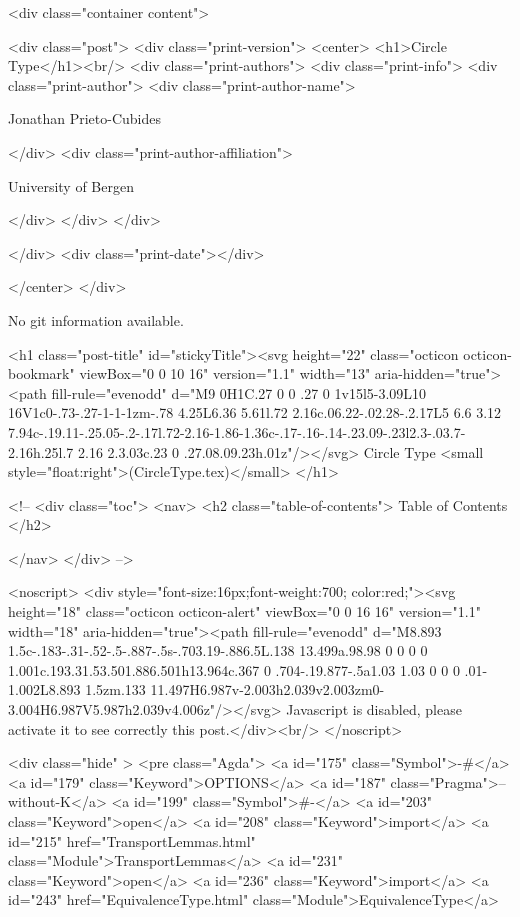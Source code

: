       <div class="container content">
        







<div class="post">
  <div class="print-version">
    <center>
      <h1>Circle Type</h1><br/>
        <div class="print-authors">
          <div class="print-info">
            <div class="print-author">
              <div class="print-author-name">
                
                  Jonathan Prieto-Cubides
                
              </div>
              <div class="print-author-affiliation">
                
                  University of Bergen
                
                </div>
            </div>
          </div>
          
          
        </div>
        <div class="print-date"></div>
        
        
    </center>
  </div>

  
  No git information available.
  

  <h1 class="post-title" id="stickyTitle"><svg height="22" class="octicon octicon-bookmark" viewBox="0 0 10 16" version="1.1" width="13" aria-hidden="true"><path fill-rule="evenodd" d="M9 0H1C.27 0 0 .27 0 1v15l5-3.09L10 16V1c0-.73-.27-1-1-1zm-.78 4.25L6.36 5.61l.72 2.16c.06.22-.02.28-.2.17L5 6.6 3.12 7.94c-.19.11-.25.05-.2-.17l.72-2.16-1.86-1.36c-.17-.16-.14-.23.09-.23l2.3-.03.7-2.16h.25l.7 2.16 2.3.03c.23 0 .27.08.09.23h.01z"/></svg> Circle Type <small style="float:right">(CircleType.tex)</small>
  </h1>

  <!-- 
  <div class="toc">
    <nav>
    <h2 class="table-of-contents"> Table of Contents </h2>
      

    </nav>
  </div>
   -->

  <noscript>
  <div style="font-size:16px;font-weight:700; color:red;"><svg height="18" class="octicon octicon-alert" viewBox="0 0 16 16" version="1.1" width="18" aria-hidden="true"><path fill-rule="evenodd" d="M8.893 1.5c-.183-.31-.52-.5-.887-.5s-.703.19-.886.5L.138 13.499a.98.98 0 0 0 0 1.001c.193.31.53.501.886.501h13.964c.367 0 .704-.19.877-.5a1.03 1.03 0 0 0 .01-1.002L8.893 1.5zm.133 11.497H6.987v-2.003h2.039v2.003zm0-3.004H6.987V5.987h2.039v4.006z"/></svg> Javascript is disabled, please activate it to see correctly this post.</div><br/>
  </noscript>

  <div class="hide" >
<pre class="Agda">
<a id="175" class="Symbol">{-#</a> <a id="179" class="Keyword">OPTIONS</a> <a id="187" class="Pragma">--without-K</a> <a id="199" class="Symbol">#-}</a>
<a id="203" class="Keyword">open</a> <a id="208" class="Keyword">import</a> <a id="215" href="TransportLemmas.html" class="Module">TransportLemmas</a>
<a id="231" class="Keyword">open</a> <a id="236" class="Keyword">import</a> <a id="243" href="EquivalenceType.html" class="Module">EquivalenceType</a>


